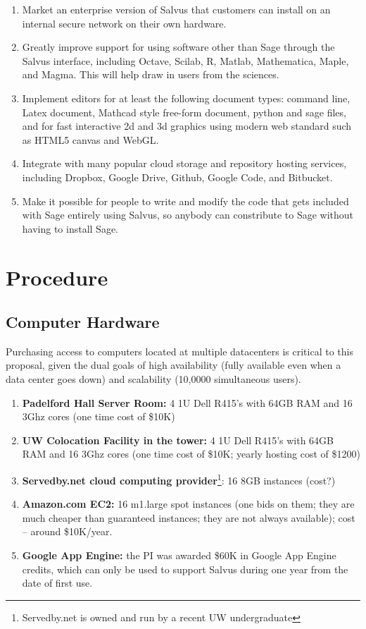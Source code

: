 \documentclass[11pt]{article}
\begin{document}
\begin{enumerate}
\item Market an enterprise version of Salvus that customers can
  install on an internal secure network on their own hardware.
\item Greatly improve support for using software other than Sage
  through the Salvus interface, including Octave, Scilab, R, Matlab,
  Mathematica, Maple, and Magma. This will help draw in users from the
  sciences.
\item Implement editors for at least the following document types:
  command line, Latex document, Mathcad style free-form document,
  python and sage files, and for fast interactive 2d and 3d graphics
  using modern web standard such as HTML5 canvas and WebGL.
\item Integrate with many popular cloud storage and repository hosting
  services, including Dropbox, Google Drive, Github, Google Code, and
  Bitbucket.
\item Make it possible for people to write and modify the code that
  gets included with Sage entirely using Salvus, so anybody can
  constribute to Sage without having to install Sage.
\end{enumerate}


\section{Procedure}


\subsection{Computer Hardware}
Purchasing access to computers located at multiple datacenters is
critical to this proposal, given the dual goals of high availability
(fully available even when a data center goes down) and scalability
(10,0000 simultaneous users).

\begin{enumerate}
\item {\bf Padelford Hall Server Room:} 4 1U Dell R415's with 64GB RAM
  and 16 3Ghz cores (one time cost of \$10K)
\item {\bf UW Colocation Facility in the tower:} 4 1U Dell R415's with
  64GB RAM and 16 3Ghz cores (one time cost of \$10K; yearly hosting
  cost of \$1200)
\item {\bf Servedby.net cloud computing
  provider}\footnote{Servedby.net is owned and run by a recent UW
  undergraduate}: 16 8GB instances (cost?)
\item {\bf Amazon.com EC2:} 16 m1.large spot instances (one bids on
  them; they are much cheaper than guaranteed instances; they are not
  always available); cost -- around \$10K/year.
\item {\bf Google App Engine:} the PI was awarded \$60K in Google App
  Engine credits, which can only be used to support Salvus during one
  year from the date of first use.
\end{enumerate}
\end{document}
